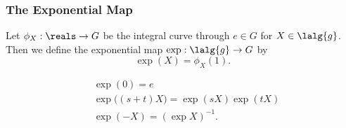 \documentclass[../main.tex]{subfiles}
\begin{document}
\subsubsection{The Exponential Map}
\begin{definition}
\label{def:The-Exponential-Map}
    Let \(\phi_X : \reals \to G\) be the integral curve through \(e \in
    G\) for \(X \in \lalg{g}\). Then we define the exponential map \(\exp
    : \lalg{g} \to G\) by 
    \[
    \exp(X) = \phi_X(1).
    \]
\end{definition}
\begin{theorem}
\label{thm:Properties-of-the-Exponential-Map}
    \[
    \begin{aligned}
        &\exp(0) = e\\
        &\exp\big((s+t)X\big) = \exp(sX)\exp(tX)\\
        &\exp(-X) = (\exp X)^{-1}.
    \end{aligned}
    \]
\end{theorem}
\end{document}
